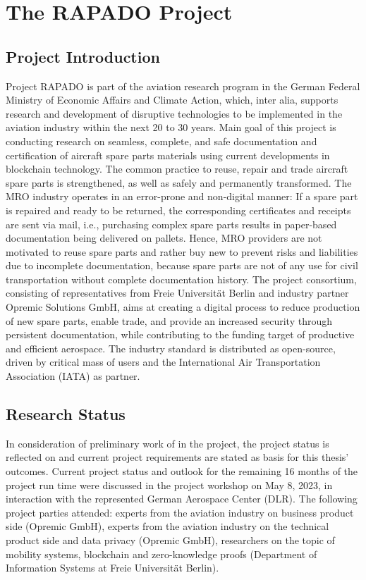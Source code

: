 \chapter{The RAPADO Project}
\section{Project Introduction}
Project RAPADO is part of the aviation research program in the German Federal Ministry of Economic Affairs and Climate Action, which, inter alia, supports research and development of disruptive technologies to be implemented in the aviation industry within the next 20 to 30 years. Main goal of this project is conducting research on seamless, complete, and safe documentation and certification of aircraft spare parts materials using current developments in blockchain technology. The common practice to reuse, repair and trade aircraft spare parts is strengthened, as well as safely and permanently transformed. The MRO industry operates in an error-prone and non-digital manner: If a spare part is repaired and ready to be returned, the corresponding certificates and receipts are sent via mail, i.e., purchasing complex spare parts results in paper-based documentation being delivered on pallets. Hence, MRO providers are not motivated to reuse spare parts and rather buy new to prevent risks and liabilities due to incomplete documentation, because spare parts are not of any use for civil transportation without complete documentation history. The project consortium, consisting of representatives from Freie Universit{\"a}t Berlin and industry partner Opremic Solutions GmbH, aims at creating a digital process to reduce production of new spare parts, enable trade, and provide an increased security through persistent documentation, while contributing to the funding target of productive and efficient aerospace. The industry standard is distributed as open-source, driven by critical mass of users and the International Air Transportation Association (IATA) as partner.

\section{Research Status}
In consideration of preliminary work of \citet{ZedelJ, Wickboldt2019BlockchainFW, semesterproject} in the project, the project status is reflected on and current project requirements are stated as basis for this thesis' outcomes. Current project status and outlook for the remaining 16 months of the project run time were discussed in the project workshop on May 8, 2023, in interaction with the represented German Aerospace Center (DLR). The following project parties attended: experts from the aviation industry on business product side (Opremic GmbH), experts from the aviation industry on the technical product side and data privacy (Opremic GmbH), researchers on the topic of mobility systems, blockchain and zero-knowledge proofs (Department of Information Systems at Freie Universit{\"a}t Berlin). 

